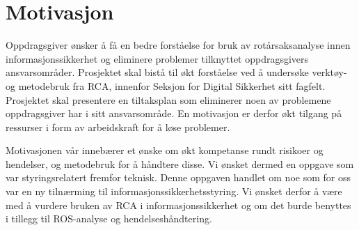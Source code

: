 \section{Motivasjon}
\label{sec:motivasjon}
Oppdragsgiver ønsker å få en bedre forståelse for bruk av rotårsaksanalyse innen informasjonssikkerhet og eliminere problemer tilknyttet oppdragsgivers ansvarsområder. Prosjektet skal bistå til økt forståelse ved å undersøke verktøy- og metodebruk fra RCA, innenfor Seksjon for Digital Sikkerhet sitt fagfelt. Prosjektet skal presentere en tiltaksplan som eliminerer noen av problemene oppdragsgiver har i sitt ansvarsområde. En motivasjon er derfor økt tilgang på ressurser i form av arbeidskraft for å løse problemer. 


Motivasjonen vår innebærer et ønske om økt kompetanse rundt risikoer og hendelser, og metodebruk for å håndtere disse. Vi ønsket dermed en oppgave som var styringsrelatert fremfor teknisk. Denne oppgaven handlet om noe som for oss var en ny tilnærming til informasjonssikkerhetsstyring. Vi ønsket derfor å være med å vurdere bruken av RCA i informasjonssikkerhet og om det burde benyttes i tillegg til ROS-analyse og hendelseshåndtering. 